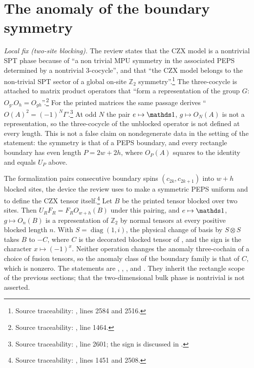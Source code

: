 \documentclass{article}
\begin{document}
\section{The anomaly of the boundary symmetry}
\emph{Local fix (two-site blocking).} The review states that the CZX model
is a nontrivial SPT phase because of ``a non trivial MPU symmetry in the
associated PEPS determined by a nontrivial 3-cocycle'', and that ``the CZX
model belongs to the non-trivial SPT sector of a global on-site
$\mathbb{Z}_2$ symmetry''.\footnote{Source traceability:
    , lines 2584 and 2516.}
The three-cocycle is attached to matrix product operators that ``form a
representation of the group $G$: $O_g.O_h=O_{gh}$''.\footnote{Source
    traceability: , line 1464.}
For the printed matrices the same passage derives
``${O}(A)^2=(-1)^N I$''.\footnote{Source traceability:
    , line 2601; the sign is
    discussed in .}
At odd $N$ the pair $e\mapsto\Id$, $g\mapsto O_N(A)$ is not a
representation, so the three-cocycle of the unblocked operator is not
defined at every length. This is not a false claim on nondegenerate data in
the setting of the statement: the symmetry is that of a PEPS boundary, and
every rectangle boundary has even length $P=2w+2h$, where $O_P(A)$ squares to
the identity and equals $U_P$ above.

The formalization pairs consecutive boundary spins
$(c_{2k},c_{2k+1})$ into $w+h$ blocked sites, the device the review uses to
make a symmetric PEPS uniform and to define the CZX tensor itself.\footnote{Source
    traceability: , lines 1451 and
    2508.}
Let $B$ be the printed tensor blocked over two sites. Then $U_RF_R=F_RO_{w+h}(B)$
under this pairing, and $e\mapsto\Id$, $g\mapsto O_n(B)$ is a representation
of $\mathbb Z_2$ by normal tensors at every positive blocked length $n$.
With $S=\operatorname{diag}(1,i)$, the physical change of basis by
$S\otimes S$ takes $B$ to $-C$, where $C$ is the decorated blocked tensor of
, and the sign is the character
$x\mapsto(-1)^x$. Neither operation changes the anomaly three-cochain of a
choice of fusion tensors, so the anomaly class of the boundary family is that
of $C$, which is nonzero. The statements are
,
,
,
 and
. They inherit the
rectangle scope of the previous sections; that the two-dimensional bulk phase
is nontrivial is not asserted.
\end{document}
